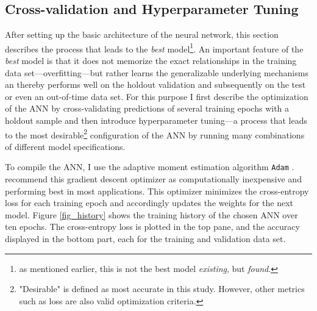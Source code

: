 \documentclass[12pt,a4paper]{article}
\let\code=\texttt
\begin{document}
\subsection{Cross-validation and Hyperparameter Tuning} \label{sec_crossval}
After setting up the basic architecture of the neural network, this section describes the process that leads to the \textit{best} model\footnote{as mentioned earlier, this is not the best model \textit{existing}, but \textit{found}.}.
An important feature of the \textit{best} model is that it does not memorize the exact relationships in the training data set---overfitting---but
rather learns the generalizable underlying mechanisms an thereby performs well on the holdout validation and subsequently on the test or even an out-of-time data set. 
For this purpose I first describe the optimization of the ANN by cross-validating predictions of several training epochs with a holdout 
sample and then introduce hyperparameter tuning---a process that leads to the most desirable\footnote{"Desirable" is defined as most accurate in this study. However, other metrics such as loss are also valid optimization criteria.} configuration of the ANN by
running many combinations of different model specifications.

To compile the ANN, I use the adaptive moment estimation algorithm \code{Adam} \citep{kingmaAdamMethodStochastic2014}.
\cite{ruderOverviewGradientDescent2016} recommend this gradient descent optimizer as computationally inexpensive and performing best in most applications.
This optimizer minimizes the cross-entropy loss \citep{zhangGeneralizedCrossEntropy2018} for each training epoch and accordingly updates the weights
for the next model.
Figure \ref{fig_history} shows the training history of the chosen ANN over ten epochs. The cross-entropy loss is plotted in the top pane, and the accuracy
displayed in the bottom part, each for the training and validation data set.
\end{document}
